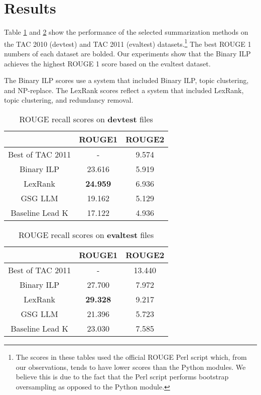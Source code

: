 \section{Results}

Table \ref{tab:rouge_devtest} and \ref{tab:rouge_evaltest} show the performance of the selected summarization methods on the TAC 2010 (devtest) and TAC 2011 (evaltest) datasets.\footnote{The scores in these tables used the official ROUGE Perl script which, from our observations, tends to have lower scores than the Python modules. We believe this is due to the fact that the Perl script performs bootstrap oversampling as opposed to the Python module.} The best ROUGE 1 numbers of each dataset are bolded. Our experiments show that the Binary ILP achieves the highest ROUGE 1 score based on the evaltest dataset.

The Binary ILP scores use a system that included Binary ILP, topic clustering, and NP-replace. The LexRank scores reflect a system that included LexRank, topic clustering, and redundancy removal.

\begin{table}[H]
    \caption{ROUGE recall scores on \textbf{devtest} files}
    \centering
    \begin{tabular}{c|c|c}
        \hline 
         & ROUGE1 & ROUGE2 \\
         \hline
         Best of TAC 2011 & - &  9.574\\
         Binary ILP & 23.616 & 5.919 \\
         LexRank & \textbf{24.959} & 6.936\\
          GSG LLM & 19.162 & 5.129 \\
          Baseline Lead K & 17.122 & 4.936 \\
         \hline
    \end{tabular}
    \label{tab:rouge_devtest}
\end{table}

\begin{table}[H]
    \caption{ROUGE recall scores on \textbf{evaltest} files}
    \centering
    \begin{tabular}{c|c|c}
        \hline 
         & ROUGE1 & ROUGE2 \\
         \hline
         Best of TAC 2011 & - & 13.440 \\
         Binary ILP & 27.700 & 7.972 \\
         LexRank &  \textbf{29.328} & 9.217\\
          GSG LLM & 21.396 & 5.723 \\
          Baseline Lead K & 23.030 & 7.585 \\
         \hline
    \end{tabular}
    \label{tab:rouge_evaltest}
\end{table}

